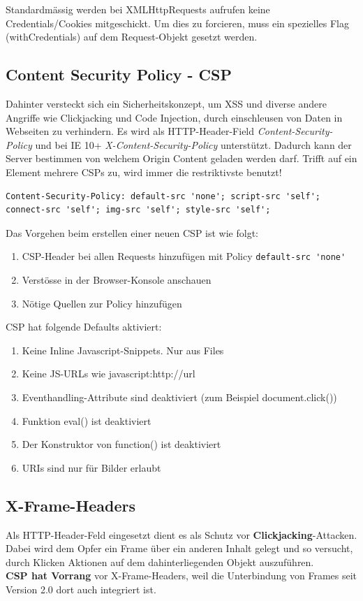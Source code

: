 Standardmässig werden bei XMLHttpRequests aufrufen keine Credentials/Cookies mitgeschickt. Um dies zu forcieren, muss ein spezielles Flag (withCredentials) auf dem Request-Objekt gesetzt werden.

\subsection{Content Security Policy - CSP}
Dahinter versteckt sich ein Sicherheitskonzept, um XSS und diverse andere Angriffe wie Clickjacking und Code Injection, durch einschleusen von Daten in Webseiten zu verhindern. Es wird als HTTP-Header-Field \textit{Content-Security-Policy} und bei IE 10+ \textit{X-Content-Security-Policy} unterstützt.
Dadurch kann der Server bestimmen von welchem Origin Content geladen werden darf. Trifft auf ein Element mehrere CSPs zu, wird immer die restriktivste benutzt!

\begin{lstlisting}[caption=Starter Policy für CSP-Header, language={}]
Content-Security-Policy: default-src 'none'; script-src 'self'; connect-src 'self'; img-src 'self'; style-src 'self';
\end{lstlisting}

Das Vorgehen beim erstellen einer neuen CSP ist wie folgt:
\begin{enumerate}
	\item CSP-Header bei allen Requests hinzufügen mit Policy \lstinline[language=clean]|default-src 'none'|
	\item Verstösse in der Browser-Konsole anschauen
	\item Nötige Quellen zur Policy hinzufügen
\end{enumerate}

CSP hat folgende Defaults aktiviert:
\begin{enumerate}
	\item Keine Inline Javascript-Snippets. Nur aus Files 
	\item Keine JS-URLs wie javascript:http://url
	\item Eventhandling-Attribute sind deaktiviert (zum Beispiel document.click())
	\item Funktion eval() ist deaktiviert
	\item Der Konstruktor von function() ist deaktiviert
	\item URIs sind nur für Bilder erlaubt
\end{enumerate}

\subsection{X-Frame-Headers}
Als HTTP-Header-Feld eingesetzt dient es als Schutz vor \textbf{Clickjacking}-Attacken. Dabei wird dem Opfer ein Frame über ein anderen Inhalt gelegt und so versucht, durch Klicken Aktionen auf dem dahinterliegenden Objekt auszuführen.\\
\textbf{CSP hat Vorrang} vor X-Frame-Headers, weil die Unterbindung von Frames seit Version 2.0 dort auch integriert ist.

